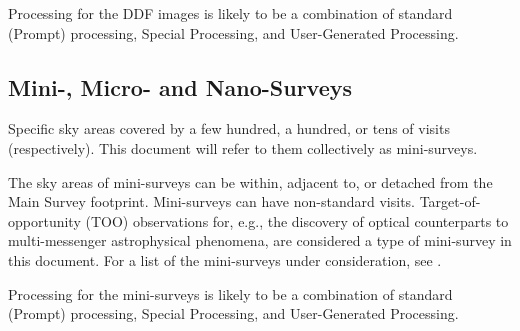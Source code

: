Processing for the DDF images is likely to be a combination of standard (Prompt) processing,
Special Processing, and User-Generated Processing.

\subsection{Mini-, Micro- and Nano-Surveys}

Specific sky areas covered by a few hundred, a hundred, or tens of visits (respectively).
This document will refer to them collectively as mini-surveys.

The sky areas of mini-surveys can be within, adjacent to, or detached from the Main Survey footprint.
Mini-surveys can have non-standard visits.
Target-of-opportunity (TOO) observations for, e.g., the discovery of optical counterparts to 
multi-messenger astrophysical phenomena, are considered a type of mini-survey in this document.
For a list of the mini-surveys under consideration,
see .

Processing for the mini-surveys is likely to be a combination of standard (Prompt) processing,
Special Processing, and User-Generated Processing.
